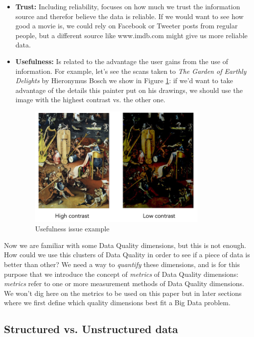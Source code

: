 \documentclass[%
 reprint,
 amsmath,amssymb,
 aps,
]{revtex4-1}
\begin{document}
\begin{itemize}
  \item \textbf{Trust:} Including reliability, focuses on how much  we trust the information source and therefor believe the data is reliable. If we would want to see how good a movie is, we could rely on Facebook or Tweeter posts from regular people, but a different source like www.imdb.com might give us more reliable data. 
  
  \item \textbf{Usefulness:} Is related to the advantage the user gains from the use of information. For example, let's see the scans taken to \emph{The Garden of Earthly Delights} by Hieronymus Bosch we show in Figure \ref{fig:usefulness}: if we'd want to take advantage of the details this painter put on his drawings, we should use the image with the highest contrast vs. the other one.
  
  \begin{figure}[h]
    \includegraphics[width=8.8cm]{usefullness.png}
    \centering
    \caption{Usefulness issue example}
    \label{fig:usefulness}
  \end{figure}
\end{itemize}

Now we are familiar with some Data Quality dimensions, but this is not enough. How could we use this clusters of Data Quality in order to see if a piece of data is better than other? We need a way to \emph{quantify} these dimensions, and is for this purpose that we introduce the concept of \emph{metrics} of Data Quality dimensions: \emph{metrics} refer to one or more measurement methods of Data Quality dimensions. We won't dig here on the metrics to be used on this paper but in later sections where we first define which quality dimensions best fit a Big Data problem.

\subsection{\label{sec:level1}Structured vs. Unstructured data}
\end{document}
